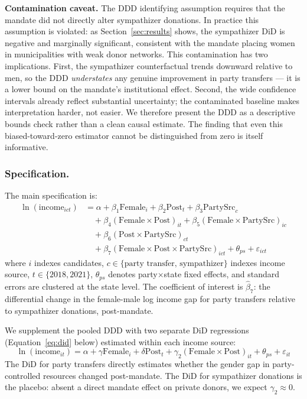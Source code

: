 \documentclass[12pt]{article}
\begin{document}
\textbf{Contamination caveat.} The DDD identifying assumption requires that the mandate did not directly alter sympathizer donations. In practice this assumption is violated: as Section~\ref{sec:results} shows, the sympathizer DiD is negative and marginally significant, consistent with the mandate placing women in municipalities with weak donor networks. This contamination has two implications. First, the sympathizer counterfactual trends downward relative to men, so the DDD \emph{understates} any genuine improvement in party transfers --- it is a lower bound on the mandate's institutional effect. Second, the wide confidence intervals already reflect substantial uncertainty; the contaminated baseline makes interpretation harder, not easier. We therefore present the DDD as a descriptive bounds check rather than a clean causal estimate. The finding that even this biased-toward-zero estimator cannot be distinguished from zero is itself informative.

\subsubsection*{Specification.}
The main specification is:
\begin{align}
\ln(\text{income}_{ict}) &= \alpha + \beta_1 \text{Female}_i + \beta_2 \text{Post}_t + \beta_3 \text{PartySrc}_c \nonumber \\
&\quad + \beta_4 (\text{Female} \times \text{Post})_{it} + \beta_5 (\text{Female} \times \text{PartySrc})_{ic} \nonumber \\
&\quad + \beta_6 (\text{Post} \times \text{PartySrc})_{ct} \nonumber \\
&\quad + \beta_7 (\text{Female} \times \text{Post} \times \text{PartySrc})_{ict} + \theta_{ps} + \varepsilon_{ict}
\label{eq:ddd}
\end{align}
where $i$ indexes candidates, $c \in \{\text{party transfer, sympathizer}\}$ indexes income source, $t \in \{2018, 2021\}$, $\theta_{ps}$ denotes party$\times$state fixed effects, and standard errors are clustered at the state level. The coefficient of interest is $\hat{\beta}_7$: the differential change in the female-male log income gap for party transfers relative to sympathizer donations, post-mandate.

We supplement the pooled DDD with two separate DiD regressions (Equation~\ref{eq:did} below) estimated within each income source:
\begin{equation}
\ln(\text{income}_{it}) = \alpha + \gamma \text{Female}_i + \delta \text{Post}_t + \gamma_2 (\text{Female} \times \text{Post})_{it} + \theta_{ps} + \varepsilon_{it}
\label{eq:did}
\end{equation}
The DiD for party transfers directly estimates whether the gender gap in party-controlled resources changed post-mandate. The DiD for sympathizer donations is the placebo: absent a direct mandate effect on private donors, we expect $\gamma_2 \approx 0$.
\end{document}
